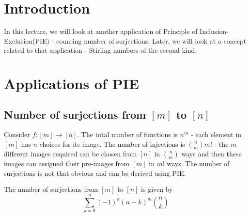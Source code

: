
\section{Introduction}
In this lecture, we will look at another application of Principle of Inclusion-Exclusion(PIE) - counting number of surjections. Later, we will look at a concept related to that application - Stirling numbers of the second kind.

\section{Applications of PIE} \label{sec:Applications of PIE - lec2}
\subsection{Number of surjections from $[m]$ to $[n]$} \label{subsec:surjections application}
Consider $f : [m] \rightarrow [n]$. The total number of functions is $n^m$ - each element in $[m]$ has $n$ choices for its image. The number of injections is ${n \choose m}m!$ - the $m$ different images required can be chosen from $[n]$ in ${n \choose m}$ ways and then these images can assigned their pre-images from $[m]$ in $m!$ ways. The number of surjections is not that obvious and can be derived using PIE.\\
\begin{theorem}
The number of surjections from $[m]$ to $[n]$ is given by
$$\sum_{k=0}^{n} (-1)^k (n-k)^m {n \choose k}$$
\end{theorem}
